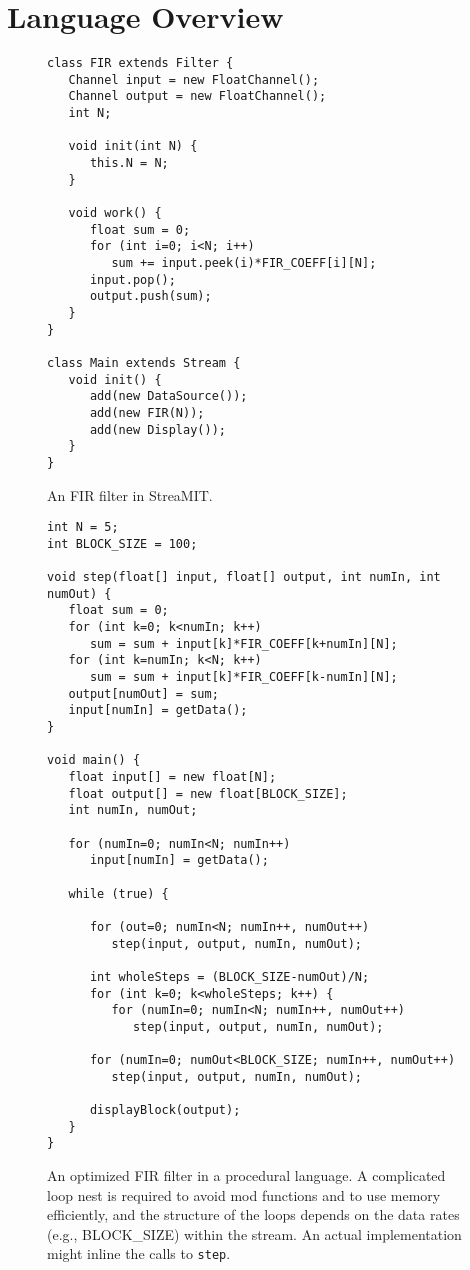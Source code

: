\section{Language Overview}
\label{sec:overview}

\begin{figure}
\scriptsize
\begin{verbatim}
class FIR extends Filter {
   Channel input = new FloatChannel();
   Channel output = new FloatChannel();
   int N;

   void init(int N) {
      this.N = N;
   }

   void work() {
      float sum = 0;
      for (int i=0; i<N; i++) 
         sum += input.peek(i)*FIR_COEFF[i][N];
      input.pop();
      output.push(sum);
   }
}

class Main extends Stream {
   void init() {
      add(new DataSource());
      add(new FIR(N));
      add(new Display());
   }
}
\end{verbatim}
\vspace{-12pt}
\caption{\protect\small An FIR filter in StreaMIT.
\protect\label{fig:firstreamit}}
\vspace{-12pt}
\end{figure}

\begin{figure}[t]
\scriptsize
\begin{verbatim}
int N = 5;
int BLOCK_SIZE = 100;

void step(float[] input, float[] output, int numIn, int numOut) {
   float sum = 0;
   for (int k=0; k<numIn; k++)
      sum = sum + input[k]*FIR_COEFF[k+numIn][N];
   for (int k=numIn; k<N; k++) 
      sum = sum + input[k]*FIR_COEFF[k-numIn][N];
   output[numOut] = sum;
   input[numIn] = getData();
}

void main() {
   float input[] = new float[N];
   float output[] = new float[BLOCK_SIZE];
   int numIn, numOut;

   for (numIn=0; numIn<N; numIn++)
      input[numIn] = getData();

   while (true) {

      for (out=0; numIn<N; numIn++, numOut++)
         step(input, output, numIn, numOut);

      int wholeSteps = (BLOCK_SIZE-numOut)/N;
      for (int k=0; k<wholeSteps; k++) {
         for (numIn=0; numIn<N; numIn++, numOut++)
            step(input, output, numIn, numOut);

      for (numIn=0; numOut<BLOCK_SIZE; numIn++, numOut++)
         step(input, output, numIn, numOut);

      displayBlock(output);
   }
}
\end{verbatim}
\vspace{-12pt}
\caption{\protect\small An optimized FIR filter in a procedural
   language.  A complicated loop nest is required to avoid mod
   functions and to use memory efficiently, and the structure of the
   loops depends on the data rates (e.g., BLOCK\_SIZE) within the
   stream.  An actual implementation might inline the calls to {\tt step}.
\protect\label{fig:firprocedural}}
\vspace{-12pt}
\end{figure}

